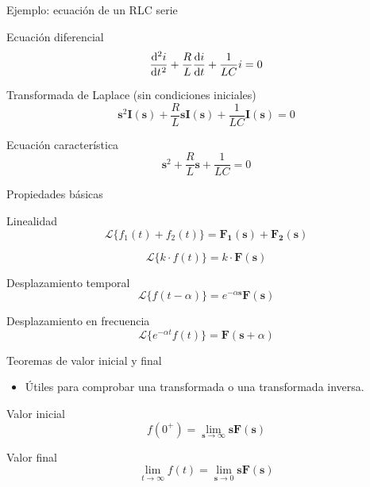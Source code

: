 \documentclass[aspectratio=169, usenames,svgnames,dvipsnames]{beamer}
\newcommand{\laplace}[1]{\mathbf{#1}(\mathbf{s})}
\newcommand{\slp}{\mathbf{s}}
\begin{document}
\begin{frame}[label={sec:org5d5ee07}]{Ejemplo: ecuación de un RLC serie}
\begin{block}{Ecuación diferencial}
\[
  \diff[2]{i}{t} + \frac{R}{L} \diff{i}{t} + \frac{1}{LC} i = 0
\]
\end{block}

\begin{block}{Transformada de Laplace (sin condiciones iniciales)}
\[
  \slp^2 \laplace{I} + \frac{R}{L} \slp \laplace{I}  + \frac{1}{LC} \laplace{I} = 0
\]
\end{block}

\begin{block}{Ecuación característica}
\[
  \slp^2 + \frac{R}{L} \slp  + \frac{1}{LC} = 0
\]
\end{block}
\end{frame}

\begin{frame}[label={sec:org9053afd}]{Propiedades básicas}
\begin{block}{Linealidad}
\[
\mathcal{L}\{f_1(t) + f_2(t)\} = \laplace{F_1} + \laplace{F_2}
\]

\[
\mathcal{L}\{k \cdot f(t)\} = k \cdot \laplace{F}
\]
\end{block}

\begin{block}{Desplazamiento temporal}
\[
\mathcal{L}\{f(t - \alpha)\} = e^{-\alpha \slp} \laplace{F}
\]
\end{block}

\begin{block}{Desplazamiento en frecuencia}
\[
\mathcal{L}\{e^{-\alpha t}f(t)\} = \mathbf{F}(\slp + \alpha)
\]
\end{block}
\end{frame}

\begin{frame}[label={sec:org51e323c}]{Teoremas de valor inicial y final}
\begin{itemize}
\item Útiles para comprobar una transformada o una transformada inversa.
\end{itemize}
\begin{block}{Valor inicial}
\[
f(0^+) = \lim_{\slp \to \infty} \slp \laplace{F} 
\]
\end{block}
\begin{block}{Valor final}
\[
\lim_{t \to \infty} f(t) = \lim_{\slp \to 0} \slp \laplace{F} 
\]
\end{block}
\end{frame}
\end{document}
